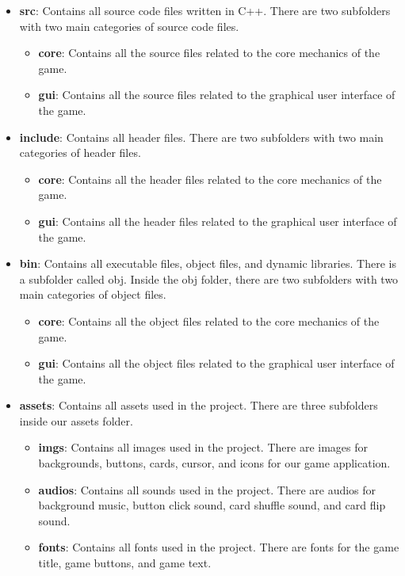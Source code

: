 \begin{itemize}
    \item \textbf{src}: Contains all source code files written in C++. There are two subfolders with two main categories of source code files.
    \begin{itemize}
        \item \textbf{core}: Contains all the source files related to the core mechanics of the game.
        \item \textbf{gui}: Contains all the source files related to the graphical user interface of the game.
    \end{itemize}
    \item \textbf{include}: Contains all header files. There are two subfolders with two main categories of header files.
    \begin{itemize}
        \item \textbf{core}: Contains all the header files related to the core mechanics of the game.
        \item \textbf{gui}: Contains all the header files related to the graphical user interface of the game.
    \end{itemize}
    \item \textbf{bin}: Contains all executable files, object files, and dynamic libraries. There is a subfolder called obj. Inside the obj folder, there are two subfolders with two main categories of object files.
    \begin{itemize}
        \item \textbf{core}: Contains all the object files related to the core mechanics of the game.
        \item \textbf{gui}: Contains all the object files related to the graphical user interface of the game.
    \end{itemize}
    \item \textbf{assets}: Contains all assets used in the project. There are three subfolders inside our assets folder.
    \begin{itemize}
        \item \textbf{imgs}: Contains all images used in the project. There are images for backgrounds, buttons, cards, cursor, and icons for our game application.
        \item \textbf{audios}: Contains all sounds used in the project. There are audios for background music, button click sound, card shuffle sound, and card flip sound.
        \item \textbf{fonts}: Contains all fonts used in the project. There are fonts for the game title, game buttons, and game text.

\end{itemize}
\end{itemize}
